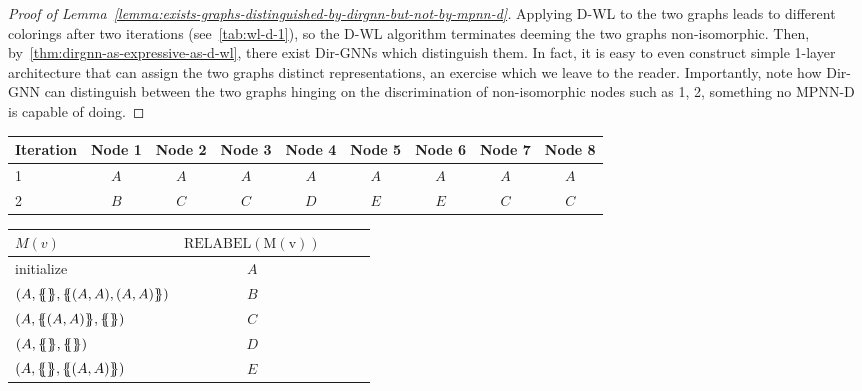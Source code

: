 \documentclass{article}
\newcommand\oursacro{Dir-GNN}
\newcommand*{\ldblbrace}{\{\mskip-6mu\{}
\newcommand*{\rdblbrace}{\}\mskip-6mu\}}
\theoremstyle{plain}
\theoremstyle{definition}
\theoremstyle{remark}
\begin{document}
\begin{proof}[Proof of Lemma~\ref{lemma:exists-graphs-distinguished-by-dirgnn-but-not-by-mpnn-d}]
    Applying D-WL to the two graphs leads to different colorings after two iterations (see~\cref{tab:wl-d-1}), so the D-WL algorithm terminates deeming the two graphs non-isomorphic. Then, by~\cref{thm:dirgnn-as-expressive-as-d-wl}, there exist \oursacro{}s which distinguish them. In fact, it is easy to even construct simple 1-layer architecture that can assign the two graphs distinct representations, an exercise which we leave to the reader. Importantly, note how \oursacro{} can distinguish between the two graphs hinging on the discrimination of non-isomorphic nodes such as 1, 2, something no MPNN-D is capable of doing.
\end{proof}

\begin{table*}[t]
\vskip 0.15in
\begin{center}
\begin{small}
\begin{sc}
\begin{tabular}{l||cccc|cccc}
\toprule
Iteration     & Node 1  & Node 2 & Node 3 & Node 4 & Node 5  & Node 6 & Node 7 & Node 8 \\
\midrule
1             &  $A$      &  $A$     &  $A$     &  $A$     &  $A$      &  $A$     &  $A$     &  $A$     \\
2             &  $B$      &  $C$     &  $C$     &  $D$     &  $E$      &  $E$     &  $C$     &  $C$     \\
\bottomrule
\end{tabular}

\begin{tabular}{lcccr}
\toprule
$M(v)$                                               & $\mathrm{RELABEL(M(v))}$   \\
\midrule
initialize                                           &   $A$                        \\
$(A, \ldblbrace \rdblbrace, \ldblbrace (A, A), (A, A) \rdblbrace)$             &   $B$                        \\
$(A, \ldblbrace (A, A) \rdblbrace, \ldblbrace \rdblbrace)$                     &   $C$                        \\
$(A, \ldblbrace  \rdblbrace, \ldblbrace \rdblbrace)$                           &   $D$                        \\
$(A, \ldblbrace  \rdblbrace, \ldblbrace (A, A) \rdblbrace)$                    &   $E$                        \\
\bottomrule
\end{tabular}

\end{sc}
\end{small}
\end{center}
\caption{Node colorings at different iterations, as well as the $\mathrm{RELABEL}$ hash function, when applying D-WL to the two graphs in~\cref{fig:mpnn-d_fails}.}
\label{tab:wl-d-1}
\end{table*}
\end{document}
